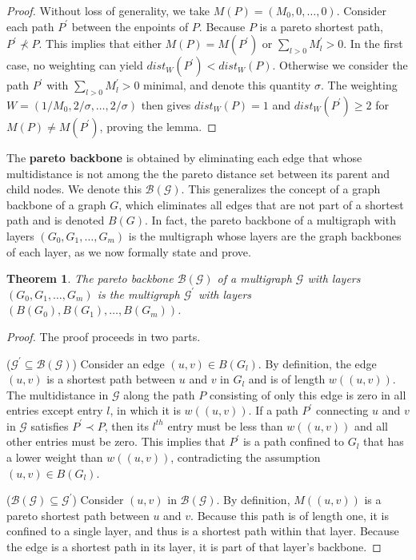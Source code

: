 \documentclass{article}
\newtheorem{theorem}{Theorem}[section]
\begin{document}
\begin{proof}
    Without loss of generality, we take $M(P)=(M_0,0,\ldots,0)$.
    Consider each path $P^\prime$ between the enpoints of $P$.
    Because $P$ is a pareto
    shortest path, $P^\prime \not \prec P$. This implies that either $M(P) = M(P^\prime)$ or
    $\sum_{l>0}M^\prime_l > 0$. In the first case, no weighting can yield $dist_W(P^\prime)<dist_W(P)$.
    Otherwise we consider the path $P^\prime$ with $\sum_{l>0}M^\prime_l>0$ minimal, and denote this
    quantity $\sigma$. The weighting $W=(1/M_0,2/\sigma,\ldots,2/\sigma)$ then gives
    $dist_W(P)=1$ and $dist_W(P^\prime)\geq 2$ for $M(P)\not = M(P^\prime)$, proving the lemma.
\end{proof}

The {\bf pareto backbone} is obtained by eliminating each edge that whose multidistance is not among the
the pareto distance set between its parent and child nodes. We denote this $\mathcal{B}(\mathcal{G})$.
This generalizes the concept of a graph
backbone of a graph $G$, which eliminates all edges that are not part of a shortest path and is denoted
$B(G)$.
In fact, the pareto backbone
of a multigraph with layers $\left(G_0,G_1,\ldots,G_m\right)$ is the multigraph whose layers are the
graph backbones of each layer, as we now formally state and prove.

\begin{theorem}
    The pareto backbone $\mathcal{B}(\mathcal{G})$ of a multigraph $\mathcal{G}$ with layers\\
    $\left(G_0,G_1,\ldots,G_m\right)$ is the multigraph $\mathcal{G}^\prime$ with layers
    $\left(B(G_0),B(G_1),\ldots,B(G_m)\right)$.
\end{theorem}
\begin{proof}
    The proof proceeds in two parts.

    ($\mathcal{G}^\prime\subseteq \mathcal{B}(\mathcal{G})$) Consider an edge $(u,v)\in B(G_l)$.
    By definition, the edge $(u,v)$ is a shortest path between $u$ and $v$ in $G_l$ and is of length
    $w((u,v))$. The multidistance in $\mathcal{G}$ along the path $P$ consisting of only this edge is
    zero in all entries except entry $l$, in which it is $w((u,v))$. If a path $P^\prime$ connecting
    $u$ and $v$ in $\mathcal{G}$ satisfies $P^\prime \prec P$, then its $l^{th}$ entry must be less
    than $w((u,v))$ and all other entries must be zero. This implies that $P^\prime$ is a path confined
    to $G_l$ that has a lower weight than $w((u,v))$, contradicting the assumption $(u,v)\in B(G_l)$.

    ($\mathcal{B}(\mathcal{G}) \subseteq \mathcal{G}^\prime$) Consider $(u,v)$ in
    $\mathcal{B}(\mathcal{G})$. By definition, $M((u,v))$ is a pareto shortest path between $u$ and $v$.
    Because this path is of length one, it is confined to a single layer, and thus is a shortest path
    within that layer. Because the edge is a shortest path in its layer, it is part of that layer's
    backbone.
\end{proof}
\end{document}
